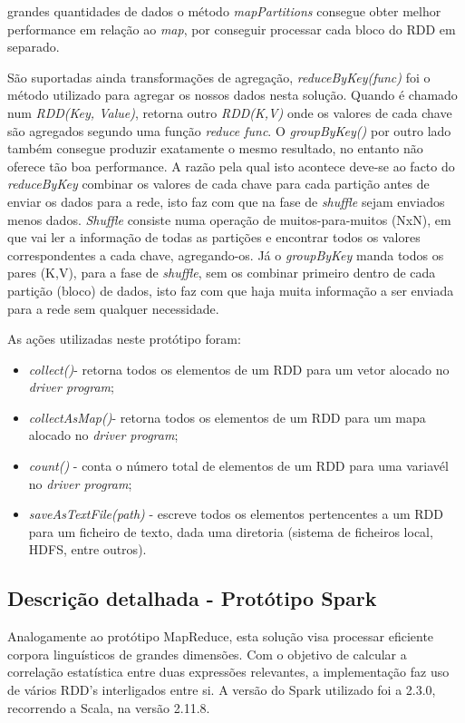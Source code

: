 grandes quantidades de dados o método \textit{mapPartitions} consegue obter melhor performance em relação ao \textit{map}, por conseguir processar cada bloco do RDD em separado. 


São suportadas ainda transformações de agregação, \textit{reduceByKey(func)} foi o método utilizado para agregar os nossos dados nesta solução. Quando é chamado num \textit{RDD(Key, Value)}, retorna outro \textit{RDD(K,V)} onde os valores de cada chave são agregados segundo uma função \textit{reduce func}. O \textit{groupByKey()} por outro lado também consegue produzir exatamente o mesmo resultado, no entanto não oferece tão boa performance. A razão pela qual isto acontece deve-se ao facto do \textit{reduceByKey} combinar os valores de cada chave para cada partição antes de enviar os dados para a rede, isto faz com que na fase de \textit{shuffle} sejam enviados menos dados. \textit{Shuffle} consiste numa operação de muitos-para-muitos (NxN), em que vai ler a informação de todas as partições e encontrar todos os valores correspondentes a cada chave, agregando-os. Já o \textit{groupByKey} manda todos os pares (K,V), para a fase de \textit{shuffle}, sem os combinar primeiro dentro de cada partição (bloco) de dados, isto faz com que haja muita informação a ser enviada para a rede sem qualquer necessidade.

As ações \cite{spark_action} utilizadas neste protótipo foram:
\begin{itemize}
    \item \textit{collect()}- retorna todos os elementos de um RDD para um vetor alocado no \textit{driver program};
    \item \textit{collectAsMap()}- retorna todos os elementos de um RDD para um mapa alocado no \textit{driver program};
    \item \textit{count()} - conta o número total de elementos de um RDD para uma variavél no \textit{driver program};
    \item \textit{saveAsTextFile(path)} - escreve todos os elementos pertencentes a um RDD para um ficheiro de texto, dada uma diretoria (sistema de ficheiros local, HDFS, entre outros).
\end{itemize}

\subsection{Descrição detalhada - Protótipo Spark}
Analogamente ao protótipo MapReduce, esta solução visa processar eficiente corpora linguísticos de grandes dimensões. Com o objetivo de calcular a correlação estatística entre duas expressões relevantes, a implementação faz uso de vários RDD's interligados entre si. A versão do Spark utilizado foi a 2.3.0, recorrendo a Scala, na versão 2.11.8. 

